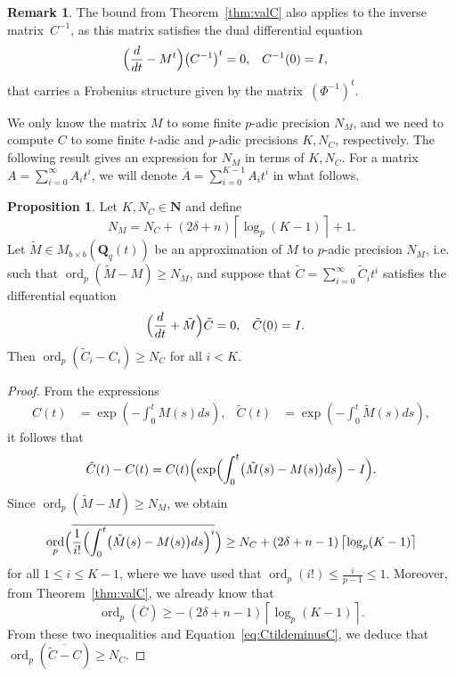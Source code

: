 \documentclass[a4paper,11pt]{article}
\numberwithin{equation}{section}
\providecommand{\ceil}[1]{\left\lceil#1\right\rceil}   %
\newcommand{\NN}{\mathbf{N}} %
\newcommand{\QQ}{\mathbf{Q}} %
\DeclareMathOperator{\ord}{ord}          %
\theoremstyle{definition}
\newtheorem{prop}[thm]{Proposition}
\newtheorem{rem}[thm]{Remark}
\begin{document}
\begin{rem} \label{rem:Cinv}
The bound from Theorem~\ref{thm:valC} 
also applies to the inverse matrix~$C^{-1}$, as this matrix satisfies 
the dual differential equation 
\begin{align} \label{eq:01-GMDE-Dual}
\Bigl(\frac{d}{dt} - M^t\Bigr) \bigl(C^{-1}\bigr)^t &= 0, &C^{-1}(0)& = I,
\end{align}
that carries a Frobenius structure 
given by the matrix~$(\Phi^{-1})^t$.
\end{rem}

We only know the matrix $M$ to some finite $p$-adic precision 
$N_M$, and we need to compute $C$ to some finite $t$-adic and 
$p$-adic precisions $K,N_C$, respectively. The following result gives an 
expression for $N_M$ in terms of $K,N_C$. For a matrix 
$A=\sum_{i=0}^{\infty} A_i t^i$, we will denote 
$\overline{A}=\sum_{i=0}^{K-1} A_i t^i$ 
in what follows. 

\begin{prop} \label{prop:N_M}
Let $K,N_C \in \NN$ and define
\[
N_M= N_C + (2 \delta + n) \ceil{\log_p(K-1)}+1.
\]
Let $\tilde{M} \in M_{b \times b}(\QQ_q(t))$ be
an approximation of $M$ to $p$-adic precision $N_M$, i.e.
such that $\ord_p(\tilde{M}-M) \geq N_M$, and suppose that 
$\tilde{C}=\sum_{i=0}^{\infty} \tilde{C}_i t^i$ satisfies the
differential equation
\begin{align*}
\Bigl(\frac{d}{dt}+\tilde{M} \Bigr) \tilde{C}&=0, &\tilde{C}(0)=I&.
\end{align*}
Then $\ord_p(\tilde{C}_i-C_i) \geq N_C$ for all $i < K$.
\end{prop}

\begin{proof}
From the expressions
\begin{align*}
C(t)&=\exp(- \int_{0}^t M(s) ds), &\tilde{C}(t)&=\exp(-\int_{0}^t \tilde{M}(s) ds),
\end{align*}
it follows that
\begin{equation} \label{eq:CtildeminusC}
\tilde{C}(t) - C(t) = C(t) \Bigl( \exp \Bigl( \int_{0}^t \bigl( \tilde{M}(s)-M(s) \bigr) ds \Bigr)- I \Bigr).
\end{equation}
Since $\ord_p(\tilde{M}-M) \geq N_M$, we obtain
\begin{equation*}
\ord_p \Bigl( \overline{\frac{1}{i!} \Bigl(\int_{0}^t \bigl( \tilde{M}(s)-M(s) \bigr) ds \Bigr)^i } \Bigr) \geq 
N_C + (2 \delta + n-1) \ceil{\log_p(K-1)}
\end{equation*}
for all $1 \leq i \leq K-1$, where we have used that $\ord_p(i!) \leq \frac{i}{p-1} \leq 1$. 
Moreover, from Theorem~\ref{thm:valC}, we already know that 
\[
\ord_p(\overline{C}) \geq -(2 \delta + n-1) \ceil{\log_p(K-1)}.
\] 
From these two inequalities and Equation~\eqref{eq:CtildeminusC}, we 
deduce that $\ord_p(\overline{\tilde{C}-C}) \geq N_C$.
\end{proof}
\end{document}
